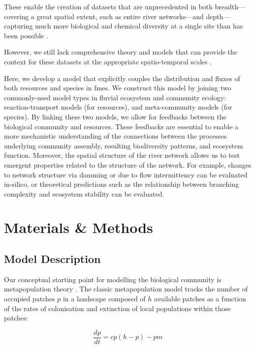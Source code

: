 \begin{itemize}
{		These enable the creation of datasets that are unprecedented in both breadth---covering a great spatial extent, such as entire river networks---and depth---capturing much more biological and chemical diversity at a single site than has been possible \autocite{Altermatt2020}.
		
		However, we still lack comprehensive theory and models that can provide the context for these datasets at the appropriate spatio-temporal scales \autocite{Gounand2018}.}
		{Here, we develop a model that explicitly couples the distribution and fluxes of both resources and species in \acp{fme}.
		We construct this model by joining two commonly-used model types in fluvial ecosystem and community ecology: reaction-transport models (for resources), and meta-community models (for species).
		By linking these two models, we allow for feedbacks between the biological community and resources.
		These feedbacks are essential to enable a more mechanistic understanding of the connections between the processes underlying community assembly, resulting biodiversity patterns, and ecosystem function.
		Moreover, the spatial structure of the river network allows us to test emergent properties related to the structure of the network.
		For example, changes to network structure via damming or due to flow intermittency can be evaluated in-silico, or theoretical predictions such as the relationship between branching complexity and ecosystem stability \autocite{Terui2018} can be evaluated.}
\end{itemize}


\section{Materials \& Methods}

\subsection{Model Description}

Our conceptual starting point for modelling the biological community is metapopulation theory \autocite{Levins1969}.
The classic metapopulation model tracks the number of occupied patches $p$ in a landscape composed of $h$ available patches as a function of the rates of colonisation and extinction of local populations within those patches:

\begin{equation}
	\frac{dp}{dt} = cp \left( h - p \right) - pm \label{eq:levins}
\end{equation}


